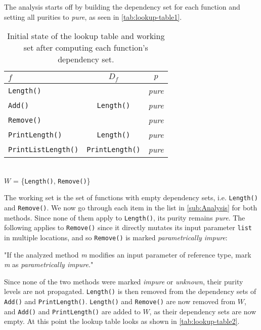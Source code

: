 \documentclass[a4paper,12pt]{article}
\begin{document}
The analysis starts off by building the dependency set for each function and setting all purities to \textit{pure}, as seen in \autoref{tab:lookup-table1}.

\begin{table}[H]
  \caption{Initial state of the lookup table and working set after computing each function's dependency set.}
  \label{tab:lookup-table1}
  \centering
  \begin{tabular}{|l|c|c|}
    \hline
    $f$                         & $D_f$                  & $p$      \\ \hline
    \texttt{Length()}           &                        & \textit{pure} \\
    \texttt{Add()}              & \texttt{Length()}      & \textit{pure} \\
    \texttt{Remove()}           &                        & \textit{pure} \\
    \texttt{PrintLength()}      & \texttt{Length()}      & \textit{pure} \\
    \texttt{PrintListLength()}  & \texttt{PrintLength()} & \textit{pure}   \\ \hline
  \end{tabular}
  \\
  $W$ = \{\texttt{Length()}, \texttt{Remove()}\}
\end{table}

The working set is the set of functions with empty dependency sets, i.e. \texttt{Length()} and \texttt{Remove()}. We now go through each item in the list in \autoref{sub:Analysis} for both methods. Since none of them apply to \texttt{Length()}, its purity remains \textit{pure}. The following applies to \texttt{Remove()} since it directly mutates its input parameter \texttt{list} in multiple locations, and so \texttt{Remove()} is marked \textit{parametrically impure}:

"If the analyzed method \textit{m} modifies an input parameter of reference type, mark \textit{m} as \textit{parametrically impure}."

Since none of the two methods were marked \textit{impure} or \textit{unknown}, their purity levels are not propagated. \texttt{Length()} is then removed from the dependency sets of \texttt{Add()} and \texttt{PrintLength()}. \texttt{Length()} and \texttt{Remove()} are now removed from $W$, and \texttt{Add()} and \texttt{PrintLength()} are added to $W$, as their dependency sets are now empty. At this point the lookup table looks as shown in \autoref{tab:lookup-table2}.
\end{document}
